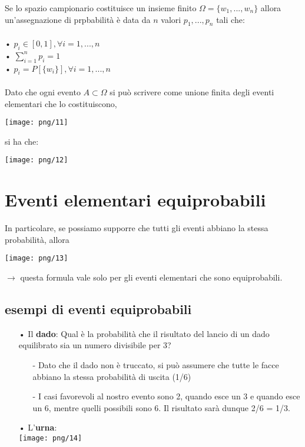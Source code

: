 \documentclass[12pt, letterpaper]{article}
\begin{document}
Se lo spazio campionario costituisce un insieme finito $\Omega = \{w_1, ... , w_n\}$ allora 
un'assegnazione di prpbabilità è data da $n$ valori $p_1, ... , p_n$ tali che:
\\
\\
• $p_i \in [0,1], \forall i = 1, ... , n$\\
• $\sum_{i=1}^n p_i = 1$\\
• $p_i = P[\{w_i\}], \forall i = 1, ... , n$
\\
\\
Dato che ogni evento $A \subset \Omega$ si può scrivere come unione finita degli eventi elementari che lo costituiscono,
\begin{center}
\texttt{[image: png/11]}
\end{center}
si ha che:
\begin{center}
\texttt{[image: png/12]}
\end{center}

\section{Eventi elementari equiprobabili}

In particolare, se possiamo supporre che tutti gli eventi abbiano la stessa probabilità, allora 
\begin{center}\texttt{[image: png/13]}\end{center}
$\rightarrow$ questa formula vale solo per gli eventi elementari che sono equiprobabili.

\subsection{esempi di eventi equiprobabili}

\begin{itemize}
   \item[•] Il \textbf{dado}: Qual è la probabilità che il risultato del lancio di un dado equilibrato sia un numero divisibile per 3?
   \begin{itemize}
      \item[-] Dato che il dado non è truccato, si può assumere che tutte le facce abbiano la stessa probabilità di uscita (1/6)
      \item[-] I casi favorevoli al nostro evento sono 2, quando esce un 3 e quando esce un 6, mentre quelli possibili sono 6. Il risultato 
               sarà dunque 2/6 = 1/3.
   \end{itemize}
   \item[•] L'\textbf{urna}:\\
   \texttt{[image: png/14]}
\end{itemize}
\end{document}

